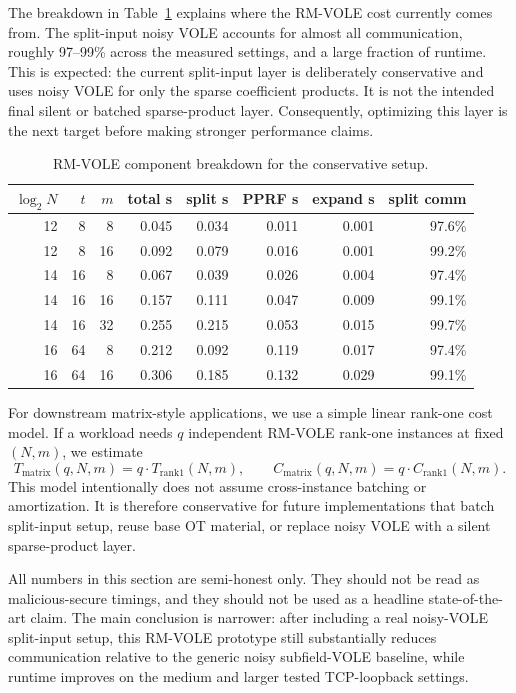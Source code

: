 The breakdown in Table~\ref{tab:rmvole-breakdown-conservative} explains where the RM-VOLE cost currently comes from.  The split-input noisy VOLE accounts for almost all communication, roughly 97--99\% across the measured settings, and a large fraction of runtime.  This is expected: the current split-input layer is deliberately conservative and uses noisy VOLE for only the sparse coefficient products.  It is not the intended final silent or batched sparse-product layer.  Consequently, optimizing this layer is the next target before making stronger performance claims.

\begin{table}[t]
\centering
\caption{RM-VOLE component breakdown for the conservative setup.}
\label{tab:rmvole-breakdown-conservative}
\begin{tabular}{rrrrrrrr}
\toprule
$\log_2 N$ & $t$ & $m$ & total s & split s & PPRF s & expand s & split comm \\
\midrule
12 & 8 & 8 & 0.045 & 0.034 & 0.011 & 0.001 & 97.6\% \\
12 & 8 & 16 & 0.092 & 0.079 & 0.016 & 0.001 & 99.2\% \\
14 & 16 & 8 & 0.067 & 0.039 & 0.026 & 0.004 & 97.4\% \\
14 & 16 & 16 & 0.157 & 0.111 & 0.047 & 0.009 & 99.1\% \\
14 & 16 & 32 & 0.255 & 0.215 & 0.053 & 0.015 & 99.7\% \\
16 & 64 & 8 & 0.212 & 0.092 & 0.119 & 0.017 & 97.4\% \\
16 & 64 & 16 & 0.306 & 0.185 & 0.132 & 0.029 & 99.1\% \\
\bottomrule
\end{tabular}
\end{table}

For downstream matrix-style applications, we use a simple linear rank-one cost model.  If a workload needs $q$ independent RM-VOLE rank-one instances at fixed $(N,m)$, we estimate
\[
  T_{\mathrm{matrix}}(q,N,m) = q \cdot T_{\mathrm{rank1}}(N,m),\qquad
  C_{\mathrm{matrix}}(q,N,m) = q \cdot C_{\mathrm{rank1}}(N,m).
\]
This model intentionally does not assume cross-instance batching or amortization.  It is therefore conservative for future implementations that batch split-input setup, reuse base OT material, or replace noisy VOLE with a silent sparse-product layer.

All numbers in this section are semi-honest only.  They should not be read as malicious-secure timings, and they should not be used as a headline state-of-the-art claim.  The main conclusion is narrower: after including a real noisy-VOLE split-input setup, this RM-VOLE prototype still substantially reduces communication relative to the generic noisy subfield-VOLE baseline, while runtime improves on the medium and larger tested TCP-loopback settings.
